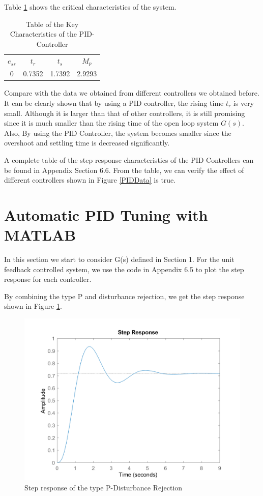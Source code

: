 \documentclass[a4paper, twocolumn, titlepage, 10pt]{article}
\begin{document}
		Table \ref{responseCharPID} shows the critical characteristics of the system. 
		\begin{table}[H]
			\centering
			\begin{tabular}{c c c c}
				$e_{ss}$ & $t_r$ & $t_s$ & $M_p$ \\
				0 & 0.7352 & 1.7392 & 2.9293
			\end{tabular}
			\caption{Table of the Key Characteristics of the PID-Controller}
			\label{responseCharPID}
		\end{table}
	
		Compare with the data we obtained from different controllers we obtained before. It can be clearly shown that by using a PID controller, the rising time $t_r$ is very small. Although it is larger than that of other controllers, it is still promising since it is much smaller than the rising time of the open loop system $G(s)$. Also, By using the PID Controller, the system becomes smaller since the overshoot and settling time is decreased significantly.
		
		A complete table of the step response characteristics of the PID Controllers can be found in Appendix Section 6.6. From the table, we can verify the effect of different controllers shown in Figure \ref{PIDData} is true.
	\section{Automatic PID Tuning with MATLAB}
		In this section we start to consider G(s) defined in Section 1. For the unit feedback controlled system, we use the code in Appendix 6.5 to plot the step response for each controller.
		
		By combining the type P and disturbance rejection, we get the step response shown in Figure \ref{p-rej-step}.
		\begin{figure}[H]
			\centering
			\includegraphics[width=\linewidth]{p-rej-step}
			\caption{Step response of the type P-Disturbance Rejection}
			\label{p-rej-step} 
		\end{figure}
		
\end{document}

